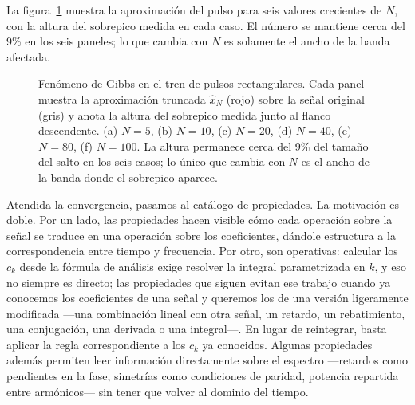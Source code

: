 \documentclass[class=book, crop=false]{standalone}
\begin{document}
La figura~\ref{fig:gibbs} muestra la aproximación del pulso para
seis valores crecientes de $N$, con la altura del sobrepico medida
en cada caso. El número se mantiene cerca del 9\% en los seis
paneles; lo que cambia con $N$ es solamente el ancho de la banda
afectada.

\begin{figure}[H]
    \centering
    \begin{minipage}{\linewidth}
        \centering
        
        \caption{Fenómeno de Gibbs en el tren de pulsos rectangulares.
                 Cada panel muestra la aproximación truncada
                 $\hat{x}_N$ (rojo) sobre la señal original (gris) y
                 anota la altura del sobrepico medida junto al
                 flanco descendente. (a) $N=5$, (b) $N=10$,
                 (c) $N=20$, (d) $N=40$, (e) $N=80$, (f) $N=100$.
                 La altura permanece cerca del 9\% del tamaño del
                 salto en los seis casos; lo único que cambia con
                 $N$ es el ancho de la banda donde el sobrepico
                 aparece.}
        \label{fig:gibbs}
    \end{minipage}
\end{figure}


Atendida la convergencia, pasamos al catálogo de propiedades. La
motivación es doble. Por un lado, las propiedades hacen visible
cómo cada operación sobre la señal se traduce en una operación
sobre los coeficientes, dándole estructura a la correspondencia
entre tiempo y frecuencia. Por otro, son operativas: calcular los
$c_k$ desde la fórmula de análisis exige resolver la integral
parametrizada en $k$, y eso no siempre es directo; las propiedades
que siguen evitan ese trabajo cuando ya conocemos los coeficientes
de una señal y queremos los de una versión ligeramente modificada
---una combinación lineal con otra señal, un retardo, un
rebatimiento, una conjugación, una derivada o una integral---. En
lugar de reintegrar, basta aplicar la regla correspondiente a los
$c_k$ ya conocidos. Algunas propiedades además permiten leer
información directamente sobre el espectro ---retardos como
pendientes en la fase, simetrías como condiciones de paridad,
potencia repartida entre armónicos--- sin tener que volver al
dominio del tiempo.
\end{document}
